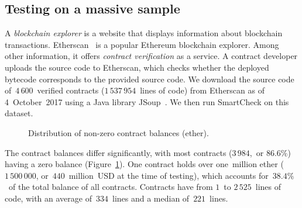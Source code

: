 \subsection{Testing on a massive sample} \label{MassiveTesting}

A \textit{blockchain explorer} is a website that displays information about blockchain transactions.
Etherscan~\cite{EtherscanVerified} is a popular Ethereum blockchain explorer.
Among other information, it offers \textit{contract verification} as a service.
A contract developer uploads the source code to Etherscan, which checks whether the deployed bytecode corresponds to the provided source code.
We download the source code of~$4\,600$~verified contracts ($1\,537\,954$~lines of code) from Etherscan as of 4~October~2017 using a Java library JSoup~\cite{JSoup}.
We then run SmartCheck on this dataset.

\begin{figure}
	\centering
	\caption{Distribution of non-zero contract balances (ether).}
	\label{BalancesFigure}
\end{figure}

The contract balances differ significantly, with most contracts ($3\,984$,~or $86.6\%$) having a zero balance (Figure~\ref{BalancesFigure}).
One contract holds over one~million ether ($1\,500\,000$, or~$440$~million~USD at the time of testing), which accounts for~$38.4\%$~of the total balance of all contracts.
Contracts have from $1$~to $2\,525$~lines of code, with an average of~$334$~lines and a median of~$221$~lines.


